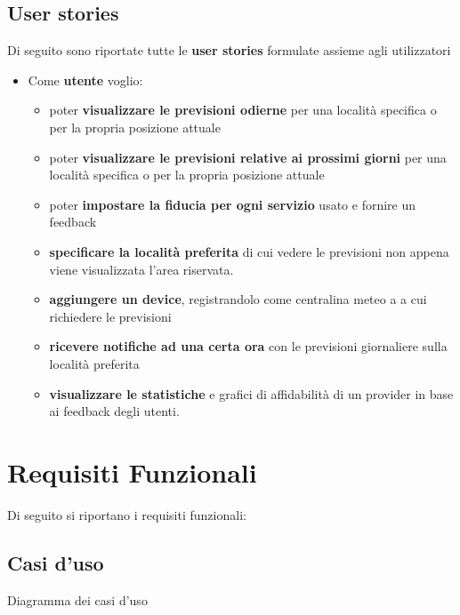         \subsection{User stories}
        Di seguito sono riportate tutte le \textbf{user stories} formulate assieme agli utilizzatori
        \begin{itemize}
            \item Come \textbf{utente}
            voglio:
            \begin{itemize}
                \item poter \textbf{visualizzare le previsioni odierne} per una località specifica o per la propria posizione attuale
                \item poter \textbf{visualizzare le previsioni relative ai prossimi giorni} per una località specifica o per la propria posizione attuale
                \item poter \textbf{impostare la fiducia per ogni servizio} usato e fornire un feedback
                \item \textbf{specificare la località preferita} di cui vedere le previsioni non appena viene visualizzata l'area riservata.
                \item \textbf{aggiungere un device}, registrandolo come centralina meteo a a cui richiedere le previsioni
                \item \textbf{ricevere notifiche ad una certa ora} con le previsioni giornaliere sulla località preferita
                \item \textbf{visualizzare le statistiche} e grafici di affidabilità di un provider in base ai feedback degli utenti.
                
            \end{itemize}
        \end{itemize}
            
	    
	\section{Requisiti Funzionali} %
	Di seguito si riportano i requisiti funzionali:
	    \subsection{Casi d'uso}
        	 Diagramma dei casi d'uso
                    
